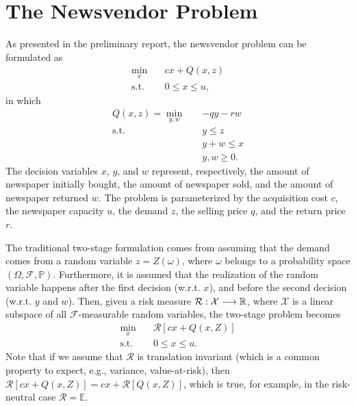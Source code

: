 \documentclass[12pt]{article}
\begin{document}
\section*{The Newsvendor Problem}

As presented in the preliminary report, the newsvendor problem can be formulated as 
\begin{equation}\label{eq:deterministic-2sp-ul}
\begin{split}
    \min_{x} \quad & c x + Q(x,z) \\
    \textrm{s.t.} \quad & 0\le x\le u
,\end{split}
\end{equation}
in which 
\begin{equation}\label{eq:deterministic-2sp-ll}
\begin{split}
    Q(x,z) = \min_{y,w} \quad & -q y - r w \\
    \textrm{s.t.} \quad & y\le z \\
      & y+w \le x \\
      & y,w \ge 0
.\end{split}
\end{equation}
The decision variables $x$, $y$, and $w$ represent, respectively, the amount of newspaper initially bought, the amount of newspaper sold, and the amount of newspaper returned $w$.
The problem is parameterized by the acquisition cost $c$, the newspaper capacity $u$, the demand $z$, the selling price $q$, and the return price $r$.

The traditional two-stage formulation comes from assuming that the demand comes from a random variable $z=Z(\omega)$, where  $\omega$ belongs to a probability space $(\Omega, \mathcal{F},\mathbb{P})$.
Furthermore, it is assumed that the realization of the random variable happens after the first decision (w.r.t. $x$), and before the second decision (w.r.t. $y$ and $w$).
Then, given a risk measure $\mathcal{R}: \mathcal{X} \longrightarrow \mathbb{R}$, where $\mathcal{X}$ is a linear subspace of all $\mathcal{F}$-measurable random variables, the two-stage problem becomes
\begin{equation}
\begin{split}
    \min_{x} \quad & \mathcal{R}[c x + Q(x,Z)] \\
    \textrm{s.t.} \quad & 0\le x\le u
.\end{split}
\end{equation}
Note that if we assume that $\mathcal{R}$ is translation invariant (which is a common property to expect, e.g., variance, value-at-risk), then $\mathcal{R}[c x + Q(x,Z)] = cx + \mathcal{R}[Q(x,Z)]$, which is true, for example, in the risk-neutral case $\mathcal{R} = \mathbb{E}$.
\end{document}
